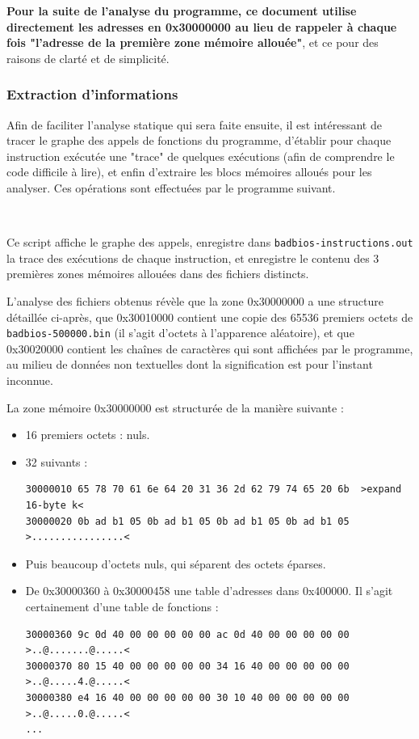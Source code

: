 \documentclass[a4paper,10pt]{article}
\newcommand{\pyinput}[1]{%
    \noindent{\color[rgb]{0.5, 0.5, 0.5}{\rule{\textwidth}{0.4pt}}}
     \\
    \noindent{\color[rgb]{0.5, 0.5, 0.5}{\rule{\textwidth}{0.4pt}}}
}
\begin{document}
\textbf{Pour la suite de l'analyse du programme, ce document utilise directement les adresses en 0x30000000 au lieu de rappeler à chaque fois "l'adresse de la première zone mémoire allouée"}, et ce pour des raisons de clarté et de simplicité.

\subsubsection{Extraction d'informations}
\label{arm64extractinfo}

Afin de faciliter l'analyse statique qui sera faite ensuite, il est intéressant de tracer le graphe des appels de fonctions du programme, d'établir pour chaque instruction exécutée une "trace" de quelques exécutions (afin de comprendre le code difficile à lire), et enfin d'extraire les blocs mémoires alloués pour les analyser. Ces opérations sont effectuées par le programme suivant.

\pyinput{2_arm64/run_unpacked_badbios3.py.inc.tex}

Ce script affiche le graphe des appels, enregistre dans \texttt{badbios-instructions.out} la trace des exécutions de chaque instruction, et enregistre le contenu des 3 premières zones mémoires allouées dans des fichiers distincts.

L'analyse des fichiers obtenus révèle que la zone 0x30000000 a une structure détaillée ci-après, que 0x30010000 contient une copie des 65536 premiers octets de \texttt{badbios-500000.bin} (il s'agit d'octets à l'apparence aléatoire), et que 0x30020000 contient les chaînes de caractères qui sont affichées par le programme, au milieu de données non textuelles dont la signification est pour l'instant inconnue.

La zone mémoire 0x30000000 est structurée de la manière suivante :
\begin{itemize}
\item 16 premiers octets : nuls.
\item 32 suivants :
\begin{verbatim}
30000010 65 78 70 61 6e 64 20 31 36 2d 62 79 74 65 20 6b  >expand 16-byte k<
30000020 0b ad b1 05 0b ad b1 05 0b ad b1 05 0b ad b1 05  >................<
\end{verbatim}
\item Puis beaucoup d'octets nuls, qui séparent des octets éparses.
\item De 0x30000360 à 0x30000458 une table d'adresses dans 0x400000. Il s'agit certainement d'une table de fonctions :
\begin{verbatim}
30000360 9c 0d 40 00 00 00 00 00 ac 0d 40 00 00 00 00 00  >..@.......@.....<
30000370 80 15 40 00 00 00 00 00 34 16 40 00 00 00 00 00  >..@.....4.@.....<
30000380 e4 16 40 00 00 00 00 00 30 10 40 00 00 00 00 00  >..@.....0.@.....<
...
\end{verbatim}
\end{itemize}
\end{document}
